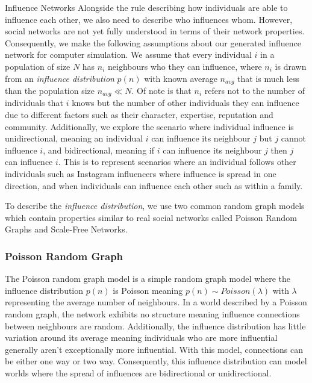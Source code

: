 \documentclass[10pt, oneside, reqno]{amsart}
\makeatletter
\theoremstyle{plain}%
\theoremstyle{definition}
\theoremstyle{remark}
\renewcommand\subsection{\@startsection{subsection}{2}%
  \z@{.5\linespacing\@plus.7\linespacing}{-.5em}%
  {\normalfont\scshape}}
\makeatother
\begin{document}
\subsection{Influence Networks}
Alongside the rule describing how individuals are able to influence each other, we also need to 
describe who influences whom.
However, social networks are not yet fully understood in terms of their network properties. 
Consequently, we make the following assumptions about our generated influence network for computer simulation.
We assume that every individual $i$ in a population of size $N$ has $n_i$ neighbours who they can influence, where 
$n_i$ is drawn from an \textit{influence distribution} $p(n)$ with known average $n_{avg}$ that is much less than the population size $n_{avg} \ll N$.
Of note is that $n_i$ refers not to the number of individuals that $i$ knows but the number of 
other individuals they can influence due to different factors such as their character, expertise, reputation and community.
Additionally, we explore the scenario where individual influence is unidirectional, meaning 
an individual $i$ can influence its neighbour $j$ but $j$ cannot influence $i$, and 
bidirectional, meaning if $i$ can influence its neighbour $j$ then $j$ can influence $i$. 
This is to represent scenarios where an individual follows other individuals such as Instagram 
influencers where influence is spread in one direction, and when individuals can influence each other such as within a family.

To describe the \textit{influence distribution}, we use two common random graph models which contain properties similar to real social networks called Poisson Random Graphs and Scale-Free Networks.


\subsubsection{Poisson Random Graph}
The Poisson random graph model is a simple random graph model where the influence distribution $p(n)$ is Poisson meaning $p(n) \sim Poisson(\lambda)$ with $\lambda$ representing the average number of neighbours. In a world described by a Poisson random graph, the network exhibits no structure meaning influence connections between neighbours are random. 
Additionally, the influence distribution has little variation around its average meaning individuals who are more influential generally aren't exceptionally more influential.
With this model, connections can be either one way or two way.
Consequently, this influence distribution can model worlds where the spread of influences are bidirectional or unidirectional.
\end{document}
